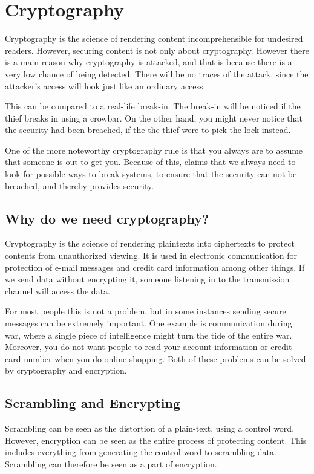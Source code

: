 \chapter{Cryptography}\label{ch:Scrambling}
Cryptography is the science of rendering content incomprehensible for 
undesired readers. However, securing content is not only about 
cryptography. However there is a main reason why cryptography is 
attacked, and that is because there is a very low chance of being 
detected. There will be no traces of the attack, since the attacker’s 
access will look just like an ordinary access. \citep{Schneier:2003}

This can be compared to a real-life break-in. The break-in will be 
noticed if the thief breaks in using a crowbar. On the other hand, you 
might never notice that the security had been breached, if the the 
thief were to pick the lock instead. \citep{Schneier:2003}

One of the more noteworthy cryptography rule is that you always are to 
assume that someone is out to get you. Because of this, 
\citet[pp. 12--14]{Schneier:2003} claims that we always need to look 
for possible ways to break systems, to ensure that the security can not 
be breached, and thereby provides security.

\section{Why do we need cryptography?}
Cryptography is the science of rendering plaintexts into ciphertexts to 
protect contents from unauthorized viewing. It is used in electronic 
communication for protection of e-mail messages and credit card 
information among other things. If we send data without encrypting it, 
someone listening in to the transmission channel will access the data.

For most people this is not a problem, but in some instances sending 
secure messages can be extremely important. One example is 
communication during war, where a single piece of intelligence might 
turn the tide of the entire war. Moreover, you do not want people to 
read your account information or credit card number when you do online 
shopping. Both of these problems can be solved by cryptography and 
encryption.


\section{Scrambling and Encrypting}
Scrambling can be seen as the distortion of a plain-text, using a 
control word. However, encryption can be seen as the entire process of 
protecting content. This includes everything from generating the 
control word to scrambling data. Scrambling can therefore be seen as a 
part of encryption.

